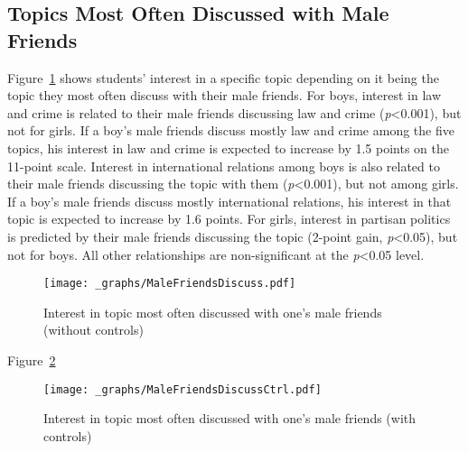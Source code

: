 \documentclass[
  letterpaper,
  DIV=11,
  numbers=noendperiod]{scrreprt}
\begin{document}
\hypertarget{topics-most-often-discussed-with-male-friends}{%
\subsection{Topics Most Often Discussed with Male
Friends}\label{topics-most-often-discussed-with-male-friends}}

Figure~\ref{fig-malefriends} shows students' interest in a specific
topic depending on it being the topic they most often discuss with their
male friends. For boys, interest in law and crime is related to their
male friends discussing law and crime (\emph{p}\textless0.001), but not
for girls. If a boy's male friends discuss mostly law and crime among
the five topics, his interest in law and crime is expected to increase
by 1.5 points on the 11-point scale. Interest in international relations
among boys is also related to their male friends discussing the topic
with them (\emph{p}\textless0.001), but not among girls. If a boy's male
friends discuss mostly international relations, his interest in that
topic is expected to increase by 1.6 points. For girls, interest in
partisan politics is predicted by their male friends discussing the
topic (2-point gain, \emph{p}\textless0.05), but not for boys. All other
relationships are non-significant at the \emph{p}\textless0.05 level.

\begin{figure}

{\centering \texttt{[image: \_graphs/MaleFriendsDiscuss.pdf]}

}

\caption{\label{fig-malefriends}Interest in topic most often discussed
with one's male friends (without controls)}

\end{figure}

Figure~\ref{fig-malefriendsctrl}

\begin{figure}

{\centering \texttt{[image: \_graphs/MaleFriendsDiscussCtrl.pdf]}

}

\caption{\label{fig-malefriendsctrl}Interest in topic most often
discussed with one's male friends (with controls)}

\end{figure}
\end{document}
